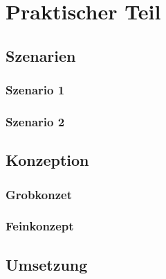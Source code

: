 \chapter{Praktischer Teil}
    \label{sec:praktischerteil}

    \section{Szenarien}
    \label{subsec:szenarien}

    \subsection{Szenario 1}
    \label{subsubsec:szenario1}

    \subsection{Szenario 2}
    \label{subsubsec:szenario2}

    \section{Konzeption}
    \label{subsection:konzeption}

    \subsection{Grobkonzet}
    \label{subsubsec:grobkonzept}

    \subsection{Feinkonzept}
    \label{subsubsec:feinkonzept}

    \section{Umsetzung}
    \label{umsetzung}

    \newpage
